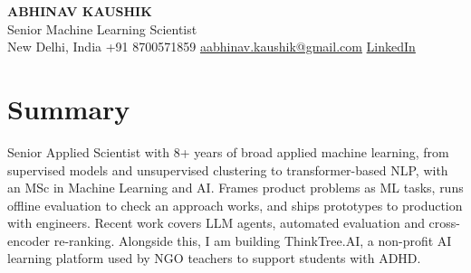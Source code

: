 \documentclass[10pt,a4paper]{article}
\begin{document}
\begin{center}
  {\LARGE\bfseries ABHINAV KAUSHIK}\\[2pt]
  {\large Senior Machine Learning Scientist}\\[2pt]
  New Delhi, India \textbar{} +91 8700571859 \textbar{} \href{mailto:aabhinav.kaushik@gmail.com}{aabhinav.kaushik@gmail.com} \textbar{} \href{https://www.linkedin.com/in/abhinav-kaushik10/}{LinkedIn}  
\end{center}

\section{Summary}
Senior Applied Scientist with 8+ years of broad applied machine learning, from supervised models and unsupervised clustering to transformer-based NLP, with an MSc in Machine Learning and AI. Frames product problems as ML tasks, runs offline evaluation to check an approach works, and ships prototypes to production with engineers. Recent work covers LLM agents, automated evaluation and cross-encoder re-ranking. Alongside this, I am building ThinkTree.AI, a non-profit AI learning platform used by NGO teachers to support students with ADHD.
\end{document}
